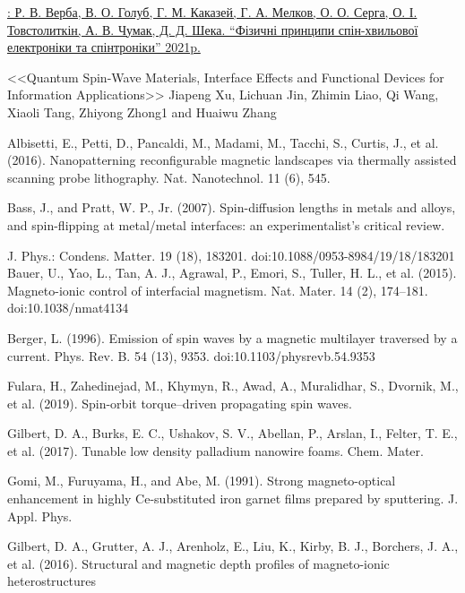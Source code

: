 \documentclass[a4paper,14pt]{extreport}
\begin{document}
\begin{thebibliography}{9}
 \href{http://www.kdpu-nt.gov.ua/sites/default/files/work_files/referat_signed.pdf}{: Р. В. Верба, В. О. Голуб, Г. М. Каказей, Г. А. Мелков,
О. О. Серга, О. І. Товстолиткін, А. В. Чумак, Д. Д. Шека. “Фізичні принципи спін-хвильової електроніки та спінтроніки” 2021p. }

 <<Quantum Spin-Wave Materials, Interface Effects and Functional Devices for Information Applications>>
Jiapeng Xu, Lichuan Jin, Zhimin Liao, Qi Wang, Xiaoli Tang, Zhiyong Zhong1 and Huaiwu Zhang

 Albisetti, E., Petti, D., Pancaldi, M., Madami, M., Tacchi, S., Curtis, J., et al. (2016).
Nanopatterning reconfigurable magnetic landscapes via thermally assisted scanning
probe lithography. Nat. Nanotechnol. 11 (6), 545.







 Bass, J., and Pratt, W. P., Jr. (2007). Spin-diffusion lengths in metals and alloys, and
spin-flipping at metal/metal interfaces: an experimentalist’s critical review.

 J. Phys.: Condens. Matter. 19 (18), 183201. doi:10.1088/0953-8984/19/18/183201
Bauer, U., Yao, L., Tan, A. J., Agrawal, P., Emori, S., Tuller, H. L., et al. (2015).
Magneto-ionic control of interfacial magnetism. Nat. Mater. 14 (2), 174–181.
doi:10.1038/nmat4134

 Berger, L. (1996). Emission of spin waves by a magnetic multilayer traversed by a
current. Phys. Rev. B. 54 (13), 9353. doi:10.1103/physrevb.54.9353



 Fulara, H., Zahedinejad, M., Khymyn, R., Awad, A., Muralidhar, S., Dvornik, M.,
et al. (2019). Spin-orbit torque–driven propagating spin waves. 

 Gilbert, D. A., Burks, E. C., Ushakov, S. V., Abellan, P., Arslan, I., Felter, T. E., et al.
(2017). Tunable low density palladium nanowire foams. Chem. Mater.


 Gomi, M., Furuyama, H., and Abe, M. (1991). Strong magneto-optical
enhancement in highly Ce-substituted iron garnet films prepared by
sputtering. J. Appl. Phys.

 Gilbert, D. A., Grutter, A. J., Arenholz, E., Liu, K., Kirby, B. J., Borchers, J. A., et al.
(2016). Structural and magnetic depth profiles of magneto-ionic heterostructures 
\end{thebibliography}
\end{document}
